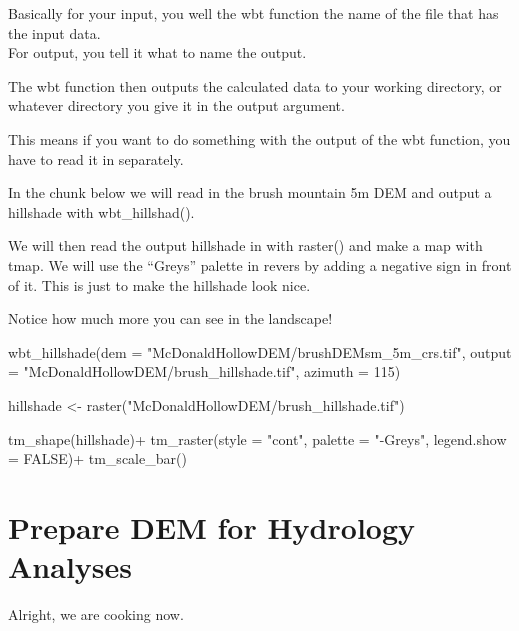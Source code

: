 \documentclass[
]{book}
\newenvironment{Shaded}{\begin{snugshade}}{\end{snugshade}}
\newcommand{\AttributeTok}[1]{\textcolor[rgb]{0.77,0.63,0.00}{#1}}
\newcommand{\ConstantTok}[1]{\textcolor[rgb]{0.00,0.00,0.00}{#1}}
\newcommand{\DecValTok}[1]{\textcolor[rgb]{0.00,0.00,0.81}{#1}}
\newcommand{\FunctionTok}[1]{\textcolor[rgb]{0.00,0.00,0.00}{#1}}
\newcommand{\NormalTok}[1]{#1}
\newcommand{\OtherTok}[1]{\textcolor[rgb]{0.56,0.35,0.01}{#1}}
\newcommand{\SpecialCharTok}[1]{\textcolor[rgb]{0.00,0.00,0.00}{#1}}
\newcommand{\StringTok}[1]{\textcolor[rgb]{0.31,0.60,0.02}{#1}}
\begin{document}
Basically for your input, you well the wbt function the name of the file that has the input data.\\
For output, you tell it what to name the output.

The wbt function then outputs the calculated data to your working directory, or whatever directory you give it in the output argument.

This means if you want to do something with the output of the wbt function, you have to read it in separately.

In the chunk below we will read in the brush mountain 5m DEM and output a hillshade with wbt\_hillshad().

We will then read the output hillshade in with raster() and make a map with tmap. We will use the ``Greys'' palette in revers by adding a negative sign in front of it. This is just to make the hillshade look nice.

Notice how much more you can see in the landscape!

\begin{Shaded}
\begin{Highlighting}[]
\FunctionTok{wbt\_hillshade}\NormalTok{(}\AttributeTok{dem =} \StringTok{"McDonaldHollowDEM/brushDEMsm\_5m\_crs.tif"}\NormalTok{,}
              \AttributeTok{output =} \StringTok{"McDonaldHollowDEM/brush\_hillshade.tif"}\NormalTok{,}
              \AttributeTok{azimuth =} \DecValTok{115}\NormalTok{)}

\NormalTok{hillshade }\OtherTok{\textless{}{-}} \FunctionTok{raster}\NormalTok{(}\StringTok{"McDonaldHollowDEM/brush\_hillshade.tif"}\NormalTok{)}

\FunctionTok{tm\_shape}\NormalTok{(hillshade)}\SpecialCharTok{+}
  \FunctionTok{tm\_raster}\NormalTok{(}\AttributeTok{style =} \StringTok{"cont"}\NormalTok{, }\AttributeTok{palette =} \StringTok{"{-}Greys"}\NormalTok{, }\AttributeTok{legend.show =} \ConstantTok{FALSE}\NormalTok{)}\SpecialCharTok{+}
  \FunctionTok{tm\_scale\_bar}\NormalTok{()}
\end{Highlighting}
\end{Shaded}

\hypertarget{prepare-dem-for-hydrology-analyses}{%
\section{Prepare DEM for Hydrology Analyses}\label{prepare-dem-for-hydrology-analyses}}

Alright, we are cooking now.
\end{document}
